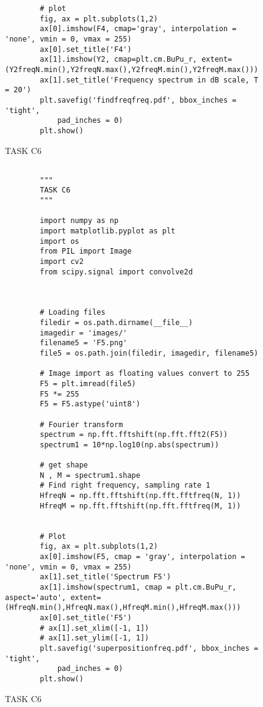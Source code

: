 {\begin{figure}[hbt!]
\begin{lstlisting}
        # plot
        fig, ax = plt.subplots(1,2)
        ax[0].imshow(F4, cmap='gray', interpolation = 'none', vmin = 0, vmax = 255)
        ax[0].set_title('F4')
        ax[1].imshow(Y2, cmap=plt.cm.BuPu_r, extent=(Y2freqN.min(),Y2freqN.max(),Y2freqM.min(),Y2freqM.max()))
        ax[1].set_title('Frequency spectrum in dB scale, T = 20')
        plt.savefig('findfreqfreq.pdf', bbox_inches = 'tight',
            pad_inches = 0)
        plt.show()
    \end{lstlisting}
\caption{TASK C6}
\label{TASK C6}
\end{figure}



\begin{figure}[hbt!]
    \begin{lstlisting}

        """
        TASK C6
        """
        
        import numpy as np 
        import matplotlib.pyplot as plt
        import os
        from PIL import Image
        import cv2
        from scipy.signal import convolve2d
        
        
        
        # Loading files
        filedir = os.path.dirname(__file__)
        imagedir = 'images/'
        filename5 = 'F5.png'
        file5 = os.path.join(filedir, imagedir, filename5)
        
        # Image import as floating values convert to 255
        F5 = plt.imread(file5)
        F5 *= 255
        F5 = F5.astype('uint8')
        
        # Fourier transform
        spectrum = np.fft.fftshift(np.fft.fft2(F5))
        spectrum1 = 10*np.log10(np.abs(spectrum))
        
        # get shape
        N , M = spectrum1.shape
        # Find right frequency, sampling rate 1
        HfreqN = np.fft.fftshift(np.fft.fftfreq(N, 1))
        HfreqM = np.fft.fftshift(np.fft.fftfreq(M, 1))
        
        
        # Plot
        fig, ax = plt.subplots(1,2)
        ax[0].imshow(F5, cmap = 'gray', interpolation = 'none', vmin = 0, vmax = 255)
        ax[1].set_title('Spectrum F5')
        ax[1].imshow(spectrum1, cmap = plt.cm.BuPu_r, aspect='auto', extent=(HfreqN.min(),HfreqN.max(),HfreqM.min(),HfreqM.max()))
        ax[0].set_title('F5')
        # ax[1].set_xlim([-1, 1])
        # ax[1].set_ylim([-1, 1])
        plt.savefig('superpositionfreq.pdf', bbox_inches = 'tight',
            pad_inches = 0)
        plt.show()
    \end{lstlisting}
\caption{TASK C6}
\label{TASK C6}
\end{figure}



}
